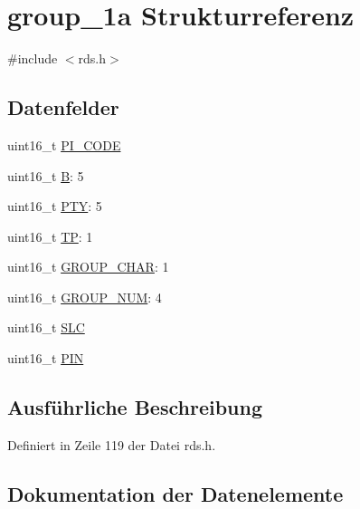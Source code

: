 \hypertarget{structgroup__1a}{}\section{group\+\_\+1a Strukturreferenz}
\label{structgroup__1a}


{\ttfamily \#include $<$rds.\+h$>$}

\subsection*{Datenfelder}
\begin{DoxyCompactItemize}
\item 
uint16\+\_\+t \hyperlink{structgroup__1a_a5cd9b1f6413028425796c1129aa8fd87}{P\+I\+\_\+\+C\+O\+D\+E}
\item 
uint16\+\_\+t \hyperlink{structgroup__1a_ae783bd90764c8455228772c025c064e4}{B}\+: 5
\item 
uint16\+\_\+t \hyperlink{structgroup__1a_a0474967478fbbc2c71b800d2e0132d45}{P\+T\+Y}\+: 5
\item 
uint16\+\_\+t \hyperlink{structgroup__1a_ab9e634c63b0d95a96716d5f6d7f06d72}{T\+P}\+: 1
\item 
uint16\+\_\+t \hyperlink{structgroup__1a_a66d4119990dc4c3e040a43885e9bb953}{G\+R\+O\+U\+P\+\_\+\+C\+H\+A\+R}\+: 1
\item 
uint16\+\_\+t \hyperlink{structgroup__1a_a9f692e9f76ee88348d426bcd4e9bc70b}{G\+R\+O\+U\+P\+\_\+\+N\+U\+M}\+: 4
\item 
uint16\+\_\+t \hyperlink{structgroup__1a_adeb94d897f554bdd08433c17155c53d2}{S\+L\+C}
\item 
uint16\+\_\+t \hyperlink{structgroup__1a_a23b9db30b873d9b45f435df66328a784}{P\+I\+N}
\end{DoxyCompactItemize}


\subsection{Ausführliche Beschreibung}


Definiert in Zeile 119 der Datei rds.\+h.



\subsection{Dokumentation der Datenelemente}
\hypertarget{structgroup__1a_ae783bd90764c8455228772c025c064e4}{}
